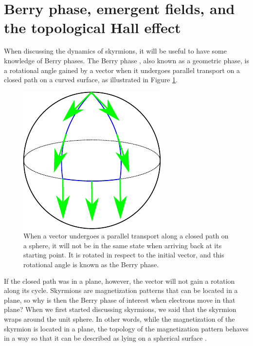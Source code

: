 \section{Berry phase, emergent fields, and the topological Hall effect} \label{sec:Berry}
When discussing the dynamics of skyrmions, it will be useful to have some knowledge of Berry phases. The Berry phase \cite{Berry1984}, also known as a geometric phase, is a rotational angle gained by a vector when it undergoes parallel transport on a closed path on a curved surface, as illustrated in Figure \ref{fig:Berry}.
\begin{figure}[h!]
\centering
  \centering
  \includegraphics[width=.4\linewidth]{Figures/BerryPhase}
\caption{When a vector undergoes a parallel transport along a closed path on a sphere, it will not be in the same state when arriving back at its starting point. It is rotated in respect to the initial vector, and this rotational angle is known as the Berry phase.}
\label{fig:Berry}
\end{figure}
If the closed path was in a plane, however, the vector will not gain a rotation along its cycle. Skyrmions are magnetization patterns that can be located in a plane, so why is then the Berry phase of interest when electrons move in that plane? When we first started discussing skyrmions, we said that the skyrmion wraps around the unit sphere. In other words, while the magnetization of the skyrmion is located in a plane, the topology of the magnetization pattern behaves in a way so that it can be described as lying on a spherical surface \cite{Everschor-Sitte2014}. 
